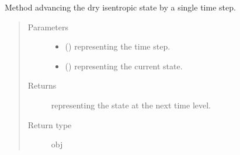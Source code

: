 \documentclass[letterpaper,10pt,english]{sphinxmanual}
\begin{document}
\begin{fulllineitems}
\begin{fulllineitems}
\begin{quote}
\begin{description}
\begin{itemize}
\end{itemize}

\end{description}\end{quote}

\end{fulllineitems}


\begin{fulllineitems}
\label{\detokenize{api:dycore.dycore_isentropic.DynamicalCoreIsentropic._integrate_dry}}
Method advancing the dry isentropic state by a single time step.
\begin{quote}\begin{description}
\item[{Parameters}] \leavevmode\begin{itemize}
\item {} 
 () \textendash{}  representing the time step.

\item {} 
 () \textendash{} {\hyperref[\detokenize{api:storages.state_isentropic.StateIsentropic}]{}} representing the current state.

\end{itemize}

\item[{Returns}] \leavevmode
{\hyperref[\detokenize{api:storages.state_isentropic.StateIsentropic}]{}} representing the state at the next time level.

\item[{Return type}] \leavevmode
obj

\end{description}\end{quote}

\end{fulllineitems}



\end{fulllineitems}
\end{document}
